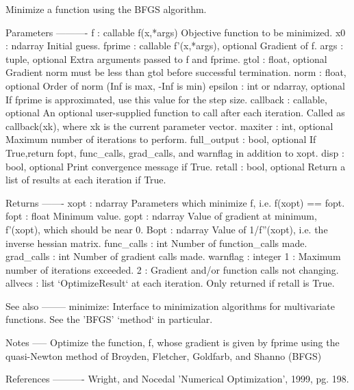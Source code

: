 \begin{DoxyVerb}Minimize a function using the BFGS algorithm.

Parameters
----------
f : callable f(x,*args)
    Objective function to be minimized.
x0 : ndarray
    Initial guess.
fprime : callable f'(x,*args), optional
    Gradient of f.
args : tuple, optional
    Extra arguments passed to f and fprime.
gtol : float, optional
    Gradient norm must be less than gtol before successful termination.
norm : float, optional
    Order of norm (Inf is max, -Inf is min)
epsilon : int or ndarray, optional
    If fprime is approximated, use this value for the step size.
callback : callable, optional
    An optional user-supplied function to call after each
    iteration.  Called as callback(xk), where xk is the
    current parameter vector.
maxiter : int, optional
    Maximum number of iterations to perform.
full_output : bool, optional
    If True,return fopt, func_calls, grad_calls, and warnflag
    in addition to xopt.
disp : bool, optional
    Print convergence message if True.
retall : bool, optional
    Return a list of results at each iteration if True.

Returns
-------
xopt : ndarray
    Parameters which minimize f, i.e. f(xopt) == fopt.
fopt : float
    Minimum value.
gopt : ndarray
    Value of gradient at minimum, f'(xopt), which should be near 0.
Bopt : ndarray
    Value of 1/f''(xopt), i.e. the inverse hessian matrix.
func_calls : int
    Number of function_calls made.
grad_calls : int
    Number of gradient calls made.
warnflag : integer
    1 : Maximum number of iterations exceeded.
    2 : Gradient and/or function calls not changing.
allvecs  :  list
    `OptimizeResult` at each iteration.  Only returned if retall is True.

See also
--------
minimize: Interface to minimization algorithms for multivariate
    functions. See the 'BFGS' `method` in particular.

Notes
-----
Optimize the function, f, whose gradient is given by fprime
using the quasi-Newton method of Broyden, Fletcher, Goldfarb,
and Shanno (BFGS)

References
----------
Wright, and Nocedal 'Numerical Optimization', 1999, pg. 198.\end{DoxyVerb}
 \hypertarget{namespacescipy_1_1optimize_1_1optimize_a77cb5c6679843a2823876599db1ab729}{}
